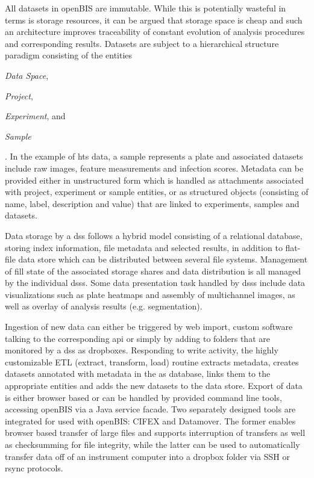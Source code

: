 All datasets in openBIS are immutable. While this is potentially wasteful in terms is storage resources, it can be argued that storage space is cheap and such an architecture improves traceability of constant evolution of analysis procedures and corresponding results. Datasets are subject to a hierarchical structure paradigm consisting of the entities \begin{enumerate*}[label=\itshape (\arabic*)] \item\textit{Data Space}, \item\textit{Project}, \item\textit{Experiment}, and \item\textit{Sample} \end{enumerate*}. In the example of \gls{hts} data, a sample represents a plate and associated datasets include raw images, feature measurements and infection scores. Metadata can be provided either in unstructured form which is handled as attachments associated with project, experiment or sample entities, or as structured objects (consisting of name, label, description and value) that are linked to experiments, samples and datasets.

Data storage by a \gls{dss} follows a hybrid model consisting of a relational database, storing index information, file metadata and selected results, in addition to flat-file data store which can be distributed between several file systems. Management of fill state of the associated storage shares and data distribution is all managed by the individual \glspl{dss}. Some data presentation task handled by \glspl{dss} include data visualizations such as plate heatmaps and assembly of multichannel images, as well as overlay of analysis results (e.g. segmentation).

Ingestion of new data can either be triggered by web import, custom software talking to the corresponding \gls{api} or simply by adding to folders that are monitored by a \gls{dss} as dropboxes. Responding to write activity, the highly customizable ETL (extract, transform, load) routine extracts metadata, creates datasets annotated with metadata in the \gls{as} database, links them to the appropriate entities and adds the new datasets to the data store. Export of data is either browser based or can be handled by provided command line tools, accessing openBIS via a Java service facade. Two separately designed tools are integrated for used with openBIS: CIFEX and Datamover. The former enables browser based transfer of large files and supports interruption  of transfers as well as checksumming for file integrity, while the latter can be used to automatically transfer data off of an instrument computer into a dropbox folder via SSH or rsync protocols.

